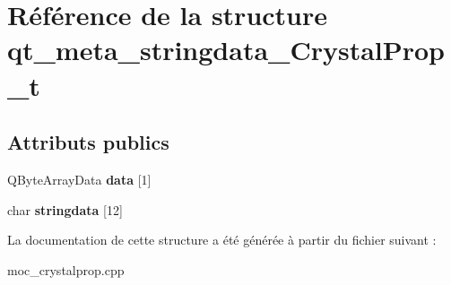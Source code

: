 \hypertarget{structqt__meta__stringdata__CrystalProp__t}{\section{Référence de la structure qt\+\_\+meta\+\_\+stringdata\+\_\+\+Crystal\+Prop\+\_\+t}
\label{structqt__meta__stringdata__CrystalProp__t}
}
\subsection*{Attributs publics}
\begin{DoxyCompactItemize}
\item 
\hypertarget{structqt__meta__stringdata__CrystalProp__t_a60eef08e6a6d02f5ab1c862cda993aff}{Q\+Byte\+Array\+Data {\bfseries data} \mbox{[}1\mbox{]}}\label{structqt__meta__stringdata__CrystalProp__t_a60eef08e6a6d02f5ab1c862cda993aff}

\item 
\hypertarget{structqt__meta__stringdata__CrystalProp__t_aab9a4149a3521d392b57b053d39da57c}{char {\bfseries stringdata} \mbox{[}12\mbox{]}}\label{structqt__meta__stringdata__CrystalProp__t_aab9a4149a3521d392b57b053d39da57c}

\end{DoxyCompactItemize}


La documentation de cette structure a été générée à partir du fichier suivant \+:\begin{DoxyCompactItemize}
\item 
moc\+\_\+crystalprop.\+cpp\end{DoxyCompactItemize}
